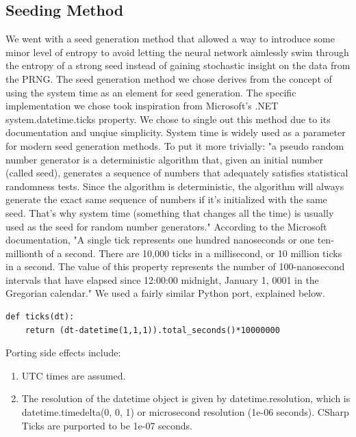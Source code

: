\documentclass[conference]{IEEEtran}
\begin{document}
\subsection{Seeding Method}
We went with a seed generation method that allowed a way to introduce some minor level of entropy to avoid letting the neural network aimlessly swim through the entropy of a strong seed instead of gaining stochastic insight on the data from the PRNG. \newline
The seed generation method we chose derives from the concept of using the system time as an element for seed generation. The specific implementation we chose took inspiration from Microsoft's .NET system.datetime.ticks property. \cite{b1} We chose to single out this method due to its documentation and unqiue simplicity. System time is widely used as a parameter for modern seed generation methods. To put it more trivially: "a pseudo random number generator is a deterministic algorithm that, given an initial number (called seed), generates a sequence of numbers that adequately satisfies statistical randomness tests. Since the algorithm is deterministic, the algorithm will always generate the exact same sequence of numbers if it's initialized with the same seed. That's why system time (something that changes all the time) is usually used as the seed for random number generators." \cite{b2} \newline
According to the Microsoft documentation, "A single tick represents one hundred nanoseconds or one ten-millionth of a second. There are 10,000 ticks in a millisecond, or 10 million ticks in a second. The value of this property represents the number of 100-nanosecond intervals that have elapsed since 12:00:00 midnight, January 1, 0001 in the Gregorian calendar." \cite{b1}  \newline
We used a fairly similar Python port, explained below. \cite{b3}
\lstset{language=Python}
\begin{lstlisting}[breaklines=true]
def ticks(dt):
    return (dt-datetime(1,1,1)).total_seconds()*10000000
\end{lstlisting} 

Porting side effects include:
\begin{enumerate}
    \item UTC times are assumed.
    \item The resolution of the datetime object is given by datetime.resolution, which is datetime.timedelta(0, 0, 1) or microsecond resolution (1e-06 seconds). CSharp Ticks are purported to be 1e-07 seconds.
\end{enumerate}
\end{document}
